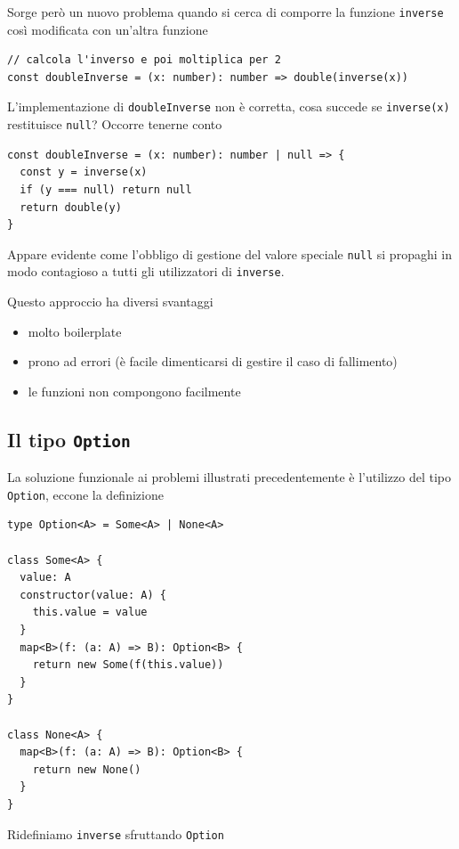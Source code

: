 \documentclass[12pt]{article}
\begin{document}
Sorge però un nuovo problema quando si cerca di comporre la funzione \texttt{inverse} così modificata con un'altra funzione

\begin{verbatim}
// calcola l'inverso e poi moltiplica per 2
const doubleInverse = (x: number): number => double(inverse(x))
\end{verbatim}

L'implementazione di \texttt{doubleInverse} non è corretta, cosa succede se \texttt{inverse(x)} restituisce \texttt{null}?
Occorre tenerne conto

\begin{verbatim}
const doubleInverse = (x: number): number | null => {
  const y = inverse(x)
  if (y === null) return null
  return double(y)
}
\end{verbatim}

Appare evidente come l'obbligo di gestione del valore speciale \texttt{null} si propaghi in modo contagioso
a tutti gli utilizzatori di \texttt{inverse}.

Questo approccio ha diversi svantaggi

\begin{itemize}
  \item molto boilerplate
  \item prono ad errori (è facile dimenticarsi di gestire il caso di fallimento)
  \item le funzioni non compongono facilmente
\end{itemize}

\subsection{Il tipo \texttt{Option}}

La soluzione funzionale ai problemi illustrati precedentemente è l'utilizzo del tipo \texttt{Option},
eccone la definizione

\begin{verbatim}
type Option<A> = Some<A> | None<A>

class Some<A> {
  value: A
  constructor(value: A) {
    this.value = value
  }
  map<B>(f: (a: A) => B): Option<B> {
    return new Some(f(this.value))
  }
}

class None<A> {
  map<B>(f: (a: A) => B): Option<B> {
    return new None()
  }
}
\end{verbatim}

Ridefiniamo \texttt{inverse} sfruttando \texttt{Option}
\end{document}
